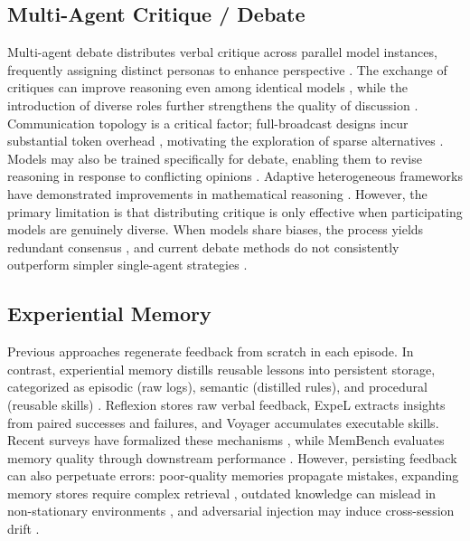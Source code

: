 \subsection{Multi-Agent Critique / Debate}%
\label{sec:multi-agent-critique}
Multi-agent debate distributes verbal critique across parallel model instances, frequently assigning distinct personas to enhance perspective \citep{hong2024metagpt}. The exchange of critiques can improve reasoning even among identical models \citep{du2023debate}, while the introduction of diverse roles further strengthens the quality of discussion \citep{chan2023chatevalbetterllmbasedevaluators}. Communication topology is a critical factor; full-broadcast designs incur substantial token overhead \citep{choi2026debate}, motivating the exploration of sparse alternatives \citep{li2024improving}. Models may also be trained specifically for debate, enabling them to revise reasoning in response to conflicting opinions \citep{liu2026learningselfdebatepreparingreasoning}. Adaptive heterogeneous frameworks have demonstrated improvements in mathematical reasoning \citep{zhou2025adaptive}. However, the primary limitation is that distributing critique is only effective when participating models are genuinely diverse. When models share biases, the process yields redundant consensus \citep{estornell2024multi, liang2024encouragingdivergentthinkinglarge}, and current debate methods do not consistently outperform simpler single-agent strategies \citep{choi2026debate}.


\subsection{Experiential Memory}%
\label{sec:experiential Memory}


Previous approaches regenerate feedback from scratch in each episode. In contrast, experiential memory distills reusable lessons into persistent storage, categorized as episodic (raw logs), semantic (distilled rules), and procedural (reusable skills) \citep{zhang2025survey}. Reflexion \citep{shinn2023reflexion} stores raw verbal feedback, ExpeL \citep{zhao2024expel} extracts insights from paired successes and failures, and Voyager \citep{wang2023voyager} accumulates executable skills. Recent surveys have formalized these mechanisms \citep{du2026memory}, while MemBench evaluates memory quality through downstream performance \citep{tan2025membench}. However, persisting feedback can also perpetuate errors: poor-quality memories propagate mistakes, expanding memory stores require complex retrieval \citep{park2023genagents}, outdated knowledge can mislead in non-stationary environments \citep{zhang2025survey}, and adversarial injection may induce cross-session drift \citep{dong2026memory}.





